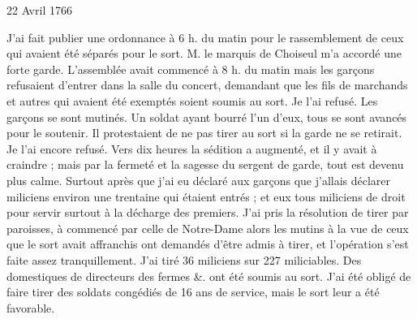                      \begin{diary}{22 Avril 1766}{}

                         J'ai fait publier une ordonnance à 6 h. du matin
                           pour le rassemblement de ceux qui avaient
                           été séparés pour le sort. M. le marquis de Choiseul
                           m'a accordé une forte garde. L'assemblée
                           avait commencé à 8 h. du matin mais les
                           garçons refusaient d'entrer dans la salle
                           du concert, demandant que les fils de marchands
                           et autres qui avaient été exemptés soient
                           soumis au sort. Je l'ai refusé. Les garçons
                           se sont mutinés. Un soldat ayant bourré l'un d'eux, tous se
                           sont avancés pour le soutenir.
                           Il protestaient de ne pas tirer au sort si la
                           garde ne se retirait. Je l'ai encore refusé.
                           Vers dix heures la sédition a augmenté, et
                           il y avait à craindre ; mais par la fermeté
                           et la sagesse du sergent de garde, tout est
                           devenu plus calme. Surtout après que
                           j'ai eu déclaré aux garçons que j'allais
                           déclarer miliciens environ une trentaine
                           qui étaient entrés ; et eux tous miliciens
                           de droit pour servir surtout à la décharge
                           des premiers. J'ai pris la résolution de
                           tirer par paroisses, à commencé par
                           celle de Notre-Dame alors les mutins à la vue
                           de ceux que le sort avait affranchis ont
                           demandés d'être admis à tirer, et l'opération
                           s'est faite assez
                           tranquillement. J'ai tiré
                           36 miliciens sur 227 miliciables.
                           Des domestiques de directeurs des fermes
                           \&. ont été soumis au sort. J'ai été
                           obligé de faire tirer des soldats congédiés
                           de 16 ans de service, mais le sort leur
                           a été favorable. \bigskip


                     \end{diary}

